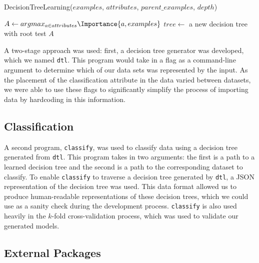 \documentclass[screen, authorversion, nonacm, sigconf]{acmart}
\begin{document}
\begin{function}
	\SetAlgoLined
  \caption{DecisionTreeLearning($examples$, $attributes$, $parent\_examples$, $depth$)}
  \label{algo:DecisionTreeLearning}
  $A \gets argmax_{a \in attributes} \Importance{a, examples}$\;
  $tree \gets$ a new decision tree with root test $A$\;
  \;
\end{function}

A two-stage approach was used: first, a decision tree generator was developed, which we named \texttt{dtl}. This program would take in a flag as a command-line argument to determine which of our data sets was represented by the input. As the placement of the classification attribute in the data varied between datasets, we were able to use these flags to significantly simplify the process of importing data by hardcoding in this information. 

\subsection{Classification}

A second program, \texttt{classify}, was used to classify data using a decision tree generated from \texttt{dtl}. This program takes in two arguments: the first is a path to a learned decision tree and the second is a path to the corresponding dataset to classify. To enable \texttt{classify} to traverse a decision tree generated by \texttt{dtl}, a JSON representation of the decision tree was used. This data format allowed us to produce human-readable representations of these decision trees, which we could use as a sanity check during the development process. \texttt{classify} is also used heavily in the $k$-fold cross-validation process, which was used to validate our generated models.

\subsection{External Packages}
\end{document}
